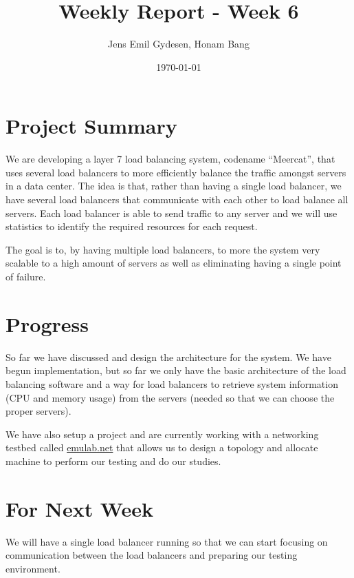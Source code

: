 \documentclass[11pt,letter]{article}
\author{Jens Emil Gydesen, Honam Bang}
\date{\today}
\title{Weekly Report - Week 6}
\begin{document}
\maketitle
\section{Project Summary}
We are developing a layer 7 load balancing system, codename ``Meercat'', that uses several load balancers to more efficiently balance the traffic amongst servers in a data center. The idea is that, rather than having a single load balancer, we have several load balancers that communicate with each other to load balance all servers. Each load balancer is able to send traffic to any server and we will use statistics to identify the required resources for each request.

The goal is to, by having multiple load balancers, to more the system very scalable to a high amount of servers as well as eliminating having a single point of failure. 
\section{Progress}
So far we have discussed and design the architecture for the system. We have begun implementation, but so far we only have the basic architecture of the load balancing software and a way for load balancers to retrieve system information (CPU and memory usage) from the servers (needed so that we can choose the proper servers). 

We have also setup a project and are currently working with a networking testbed called \url{emulab.net} that allows us to design a topology and allocate machine to perform our testing and do our studies. 
\section{For Next Week}
We will have a single load balancer running so that we can start focusing on communication between the load balancers and preparing our testing environment.  
\end{document}
